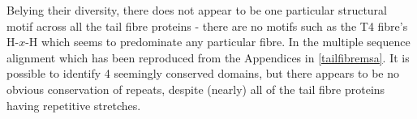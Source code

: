 Belying their diversity, there does not appear to be one particular structural motif across all the tail fibre proteins - there are no motifs such as the T4 fibre's H-$x$-H which seems to predominate any particular fibre. In the multiple sequence alignment which has been reproduced from the Appendices in \vref{tailfibremsa}. It is possible to identify 4 seemingly conserved domains, but there appears to be no obvious conservation of repeats, despite (nearly) all of the tail fibre proteins having repetitive stretches. 

\clearpage
\footnotesize
\captionsetup{singlelinecheck=off, justification=justified, font=footnotesize}
